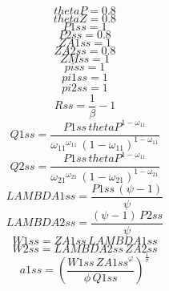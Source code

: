 \begin{dmath*}
thetaP = 0.8
\end{dmath*}
\begin{dmath*}
thetaZ = 0.8
\end{dmath*}
\begin{dmath*}
P1ss = 1
\end{dmath*}
\begin{dmath*}
P2ss = 0.8
\end{dmath*}
\begin{dmath*}
ZA1ss = 1
\end{dmath*}
\begin{dmath*}
ZA2ss = 0.8
\end{dmath*}
\begin{dmath*}
ZMss = 1
\end{dmath*}
\begin{dmath*}
piss = 1
\end{dmath*}
\begin{dmath*}
pi1ss = 1
\end{dmath*}
\begin{dmath*}
pi2ss = 1
\end{dmath*}
\begin{dmath*}
Rss = \frac{1}{{{\beta}}}-1
\end{dmath*}
\begin{dmath*}
Q1ss = \frac{{P1ss}\, {thetaP}^{1-{{\omega_{11}}}}}{{{\omega_{11}}}^{{{\omega_{11}}}}\, \left(1-{{\omega_{11}}}\right)^{1-{{\omega_{11}}}}}
\end{dmath*}
\begin{dmath*}
Q2ss = \frac{{P1ss}\, {thetaP}^{1-{{\omega_{11}}}}}{{{\omega_{21}}}^{{{\omega_{21}}}}\, \left(1-{{\omega_{21}}}\right)^{1-{{\omega_{21}}}}}
\end{dmath*}
\begin{dmath*}
LAMBDA1ss = \frac{{P1ss}\, \left({{\psi}}-1\right)}{{{\psi}}}
\end{dmath*}
\begin{dmath*}
LAMBDA2ss = \frac{\left({{\psi}}-1\right)\, {P2ss}}{{{\psi}}}
\end{dmath*}
\begin{dmath*}
W1ss = {ZA1ss}\, {LAMBDA1ss}
\end{dmath*}
\begin{dmath*}
W2ss = {LAMBDA2ss}\, {ZA2ss}
\end{dmath*}
\begin{dmath*}
a1ss = \left(\frac{{W1ss}\, {ZA1ss}^{{{\varphi}}}}{{{\phi}}\, {Q1ss}}\right)^{\frac{1}{{{\sigma}}}}
\end{dmath*}
